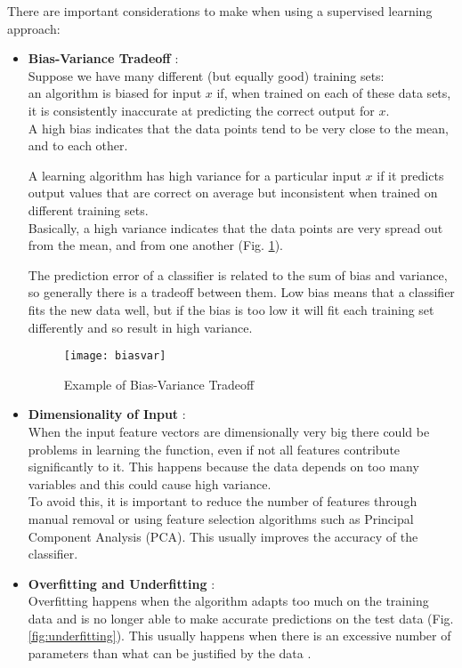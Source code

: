 There are important considerations to make when using a supervised learning approach:
\begin{itemize}
	\item \textbf{Bias-Variance Tradeoff} \cite{biasvar}: \\	
	Suppose we have many different (but equally good) training sets: \\
	an algorithm is biased for input $x$ if, when trained on each of these data sets, it is consistently inaccurate at predicting the correct output for $x$. \\
	A high bias indicates that the data points tend to be very close to the mean, and to each other.
	
	A learning algorithm has high variance for a particular input $x$ if it predicts output values that are correct on average but inconsistent when trained on different training sets. \\
	Basically, a high variance indicates that the data points are very spread out from the mean, and from one another (Fig. \ref{fig:biasvar}).
	
	The prediction error of a classifier is related to the sum of bias and variance, so generally there is a tradeoff between them. Low bias means that a classifier fits the new data well, but if the bias is too low it will fit each training set differently and so result in high variance.
	
	\begin{figure}[H]
		\centering
		\texttt{[image: biasvar]}
		\caption{Example of Bias-Variance Tradeoff \cite{biasvarTradeoff}}
		\label{fig:biasvar}
	\end{figure}	

	\item \textbf{Dimensionality of Input} \cite{wiki:dim_red}:\\ 
	When the input feature vectors are dimensionally very big there could be problems in learning the function, even if not all features contribute significantly to it. This happens because the data depends on too many variables and this could cause high variance. \\
	To avoid this, it is important to reduce the number of features through manual removal or using feature selection algorithms such as Principal Component Analysis (PCA). This usually improves the accuracy of the classifier.
	
	\item \textbf{Overfitting and Underfitting} \cite{overfit}: \\	
	Overfitting happens when the algorithm adapts too much on the training data and is no longer able to make accurate predictions on the test data (Fig. \ref{fig:underfitting}). This usually happens when there is an excessive number of parameters than what can be justified by the data \cite{camb_over}.
	

\end{itemize}
